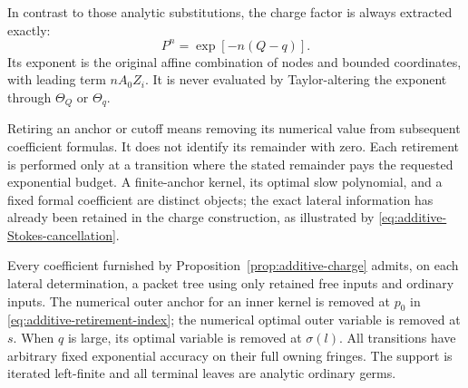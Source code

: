 In contrast to those analytic substitutions, the charge factor is
always extracted exactly:
\begin{equation}\label{eq:additive-exact-P-shift}
 P^n=\exp[-n(Q-q)].
\end{equation}
Its exponent is the original affine combination of nodes and bounded
coordinates, with leading term $nA_0Z_i$.  It is never evaluated by
Taylor-altering the exponent through $\Theta_Q$ or $\Theta_q$.

Retiring an anchor or cutoff means removing its numerical value from
subsequent coefficient formulas.  It does not identify its remainder
with zero.  Each retirement is performed only at a transition where
the stated remainder pays the requested exponential budget.  A
finite-anchor kernel, its optimal slow polynomial, and a fixed formal
coefficient are distinct objects; the exact lateral information has
already been retained in the charge construction, as illustrated by
\eqref{eq:additive-Stokes-cancellation}.

\begin{proposition}\label{prop:additive-dispersal}
Every coefficient furnished by Proposition~\ref{prop:additive-charge}
admits, on each lateral determination, a packet tree using only retained
free inputs and ordinary inputs.  The numerical outer anchor for an
inner kernel is removed at $p_0$ in
\eqref{eq:additive-retirement-index}; the numerical optimal outer
variable is removed at $s$.  When $q$ is large, its optimal variable is
removed at $\sigma(l)$.  All transitions have arbitrary fixed
exponential accuracy on their full owning fringes.  The support is
iterated left-finite and all terminal leaves are analytic ordinary
germs.
\end{proposition}

